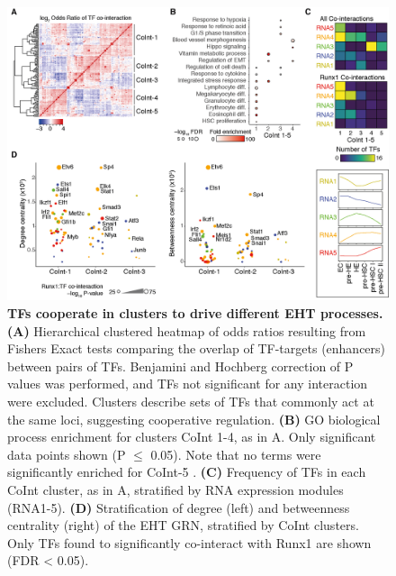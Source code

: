 \begin{figure}[!t]
    \centering
    \includegraphics[width=\textwidth,height=\textheight,keepaspectratio]{figures/chapter3/ch3_TF-cointeraction.png}
    \caption[{TFs cooperate in clusters to drive different EHT processes.}]
    {\textbf{TFs cooperate in clusters to drive different EHT processes.} 
    \textbf{(A)} Hierarchical clustered heatmap of odds ratios resulting from Fishers Exact tests comparing the overlap of TF-targets (enhancers) between pairs of TFs. Benjamini and Hochberg correction of P values was performed, and TFs not significant for any interaction were excluded. Clusters describe sets of TFs that commonly act at the same loci, suggesting cooperative regulation. 
    \textbf{(B)} GO biological process enrichment for clusters CoInt 1-4, as in A. Only significant data points shown (P $\leq$ 0.05). Note that no terms were significantly enriched for CoInt-5 .
    \textbf{(C)} Frequency of TFs in each CoInt cluster, as in A, stratified by RNA expression modules (RNA1-5). 
    \textbf{(D)} Stratification of degree (left) and betweenness centrality (right) of the EHT GRN, stratified by CoInt clusters. Only TFs found to significantly co-interact with Runx1 are shown (FDR < 0.05). 
    }
    \label{fig:ch3_TF-cointeraction}
\end{figure}

